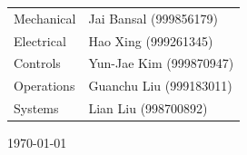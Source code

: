 \begin{titlepage}
\begin{centering} \large
\begin{tabular}{ll}
Mechanical	&	Jai Bansal (999856179)	\\
Electrical	& 	Hao Xing (999261345)	\\
Controls	&	Yun-Jae Kim (999870947)	\\
Operations	&	Guanchu Liu (999183011)	\\
Systems		&	Lian Liu (998700892)	\\[1cm]
\end{tabular}
\end{centering}




{\large \today}\\[3cm] %
 

\vfill %

\end{titlepage}

